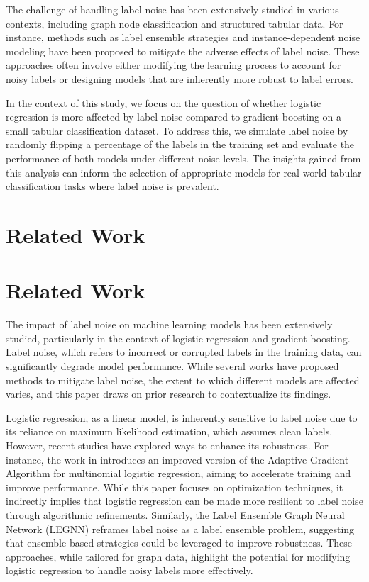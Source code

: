 \documentclass{article}
\begin{document}
The challenge of handling label noise has been extensively studied in various contexts, including graph node classification and structured tabular data. For instance, methods such as label ensemble strategies and instance-dependent noise modeling have been proposed to mitigate the adverse effects of label noise. These approaches often involve either modifying the learning process to account for noisy labels or designing models that are inherently more robust to label errors. 

In the context of this study, we focus on the question of whether logistic regression is more affected by label noise compared to gradient boosting on a small tabular classification dataset. To address this, we simulate label noise by randomly flipping a percentage of the labels in the training set and evaluate the performance of both models under different noise levels. The insights gained from this analysis can inform the selection of appropriate models for real-world tabular classification tasks where label noise is prevalent.
\section{Related Work}
\section{Related Work}

The impact of label noise on machine learning models has been extensively studied, particularly in the context of logistic regression and gradient boosting. Label noise, which refers to incorrect or corrupted labels in the training data, can significantly degrade model performance. While several works have proposed methods to mitigate label noise, the extent to which different models are affected varies, and this paper draws on prior research to contextualize its findings.

Logistic regression, as a linear model, is inherently sensitive to label noise due to its reliance on maximum likelihood estimation, which assumes clean labels. However, recent studies have explored ways to enhance its robustness. For instance, the work in \cite{2208.06828v2} introduces an improved version of the Adaptive Gradient Algorithm for multinomial logistic regression, aiming to accelerate training and improve performance. While this paper focuses on optimization techniques, it indirectly implies that logistic regression can be made more resilient to label noise through algorithmic refinements. Similarly, the Label Ensemble Graph Neural Network (LEGNN) \cite{2411.11020v2} reframes label noise as a label ensemble problem, suggesting that ensemble-based strategies could be leveraged to improve robustness. These approaches, while tailored for graph data, highlight the potential for modifying logistic regression to handle noisy labels more effectively.
\end{document}

